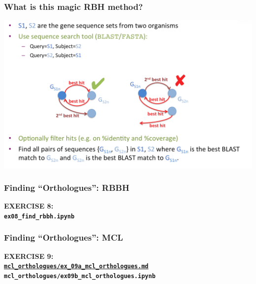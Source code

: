 \begin{frame}
  \frametitle{What is this magic RBH method?}
  \begin{center}
      \includegraphics[width=1\textwidth]{images/rbbh}      
  \end{center}
\end{frame}

%
\begin{frame}
  \frametitle{Finding ``Orthologues'': RBBH}
  \Large{
    \textcolor{hutton_blue}{
      \textbf{
      EXERCISE 8: \\
      \texttt{ex08\_find\_rbbh.ipynb}
      }
    }
  }
\end{frame}

%
\begin{frame}
  \frametitle{Finding ``Orthologues'': MCL}
  \Large{
    \textcolor{hutton_blue}{
      \textbf{
      EXERCISE 9: \\
      {\small \href{https://github.com/widdowquinn/Teaching-2015-03-17-UoD_compgenvis/blob/master/exercises/mcl_orthologues/ex09_mcl_orthologues.md}{\texttt{mcl\_orthologues/ex\_09a\_mcl\_orthologues.md}} \\
      \texttt{mcl\_orthologues/ex09b\_mcl\_orthologues.ipynb}}
      }
    }
  }
\end{frame}